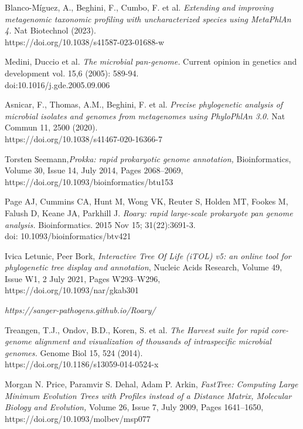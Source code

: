 \documentclass[a4paper,titlepage, oneside]{book}
\begin{document}
\begin{thebibliography}{}
Blanco-Míguez, A., Beghini, F., Cumbo, F. et al. \emph{Extending and improving metagenomic taxonomic profiling with uncharacterized species using MetaPhlAn 4.} Nat Biotechnol (2023). \\https://doi.org/10.1038/s41587-023-01688-w


Medini, Duccio et al. \emph{The microbial pan-genome.} Current opinion in genetics and development vol. 15,6 (2005): 589-94. \\doi:10.1016/j.gde.2005.09.006


Asnicar, F., Thomas, A.M., Beghini, F. et al.
\emph{Precise phylogenetic analysis of microbial isolates and genomes from metagenomes using PhyloPhlAn 3.0.} Nat Commun 11, 2500 (2020).\\ https://doi.org/10.1038/s41467-020-16366-7

Torsten Seemann,\emph{Prokka: rapid prokaryotic genome annotation,} Bioinformatics, Volume 30, Issue 14, July 2014, Pages 2068–2069,\\ https://doi.org/10.1093/bioinformatics/btu153

Page AJ, Cummins CA, Hunt M, Wong VK, Reuter S, Holden MT, Fookes M, Falush D, Keane JA, Parkhill J. \emph{Roary: rapid large-scale prokaryote pan genome analysis.} Bioinformatics. 2015 Nov 15; 31(22):3691-3. \\doi: 10.1093/bioinformatics/btv421

Ivica Letunic, Peer Bork, \emph{Interactive Tree Of Life (iTOL) v5: an online tool for phylogenetic tree display and annotation}, Nucleic Acids Research, Volume 49, Issue W1, 2 July 2021, Pages W293–W296, \\https://doi.org/10.1093/nar/gkab301

\emph{https://sanger-pathogens.github.io/Roary/}

Treangen, T.J., Ondov, B.D., Koren, S. et al. \emph{The Harvest suite for rapid core-genome alignment and visualization of thousands of intraspecific microbial genomes.} Genome Biol 15, 524 (2014).\\https://doi.org/10.1186/s13059-014-0524-x

Morgan N. Price, Paramvir S. Dehal, Adam P. Arkin, \emph{FastTree: Computing Large Minimum Evolution Trees with Profiles instead of a Distance Matrix, Molecular Biology and Evolution,} Volume 26, Issue 7, July 2009, Pages 1641–1650, \\https://doi.org/10.1093/molbev/msp077



\end{thebibliography}
\end{document}
